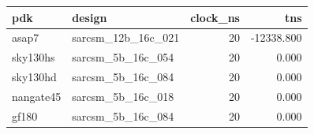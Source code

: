 \begin{tabular}{llrr}
\toprule
pdk & design & clock\_ns & tns \\
\midrule
asap7 & sarcsm\_12b\_16c\_021 & 20 & -12338.800 \\
sky130hs & sarcsm\_5b\_16c\_054 & 20 & 0.000 \\
sky130hd & sarcsm\_5b\_16c\_084 & 20 & 0.000 \\
nangate45 & sarcsm\_5b\_16c\_018 & 20 & 0.000 \\
gf180 & sarcsm\_5b\_16c\_084 & 20 & 0.000 \\
\bottomrule
\end{tabular}
